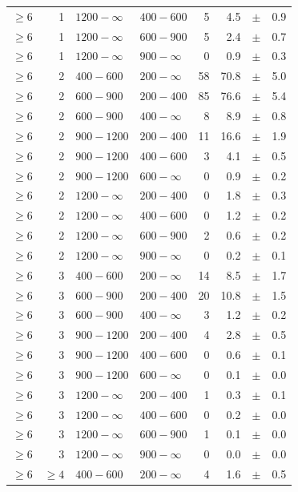 \begin{table}[!h]
\begin{tabular}{rrllrrcl}
$\geq 6$ & 1 & $1200- \infty$ & $400-600$ &      5 &      4.5 &$\pm$&    0.9 \\
$\geq 6$ & 1 & $1200- \infty$ & $600-900$ &      5 &      2.4 &$\pm$&    0.7 \\
$\geq 6$ & 1 & $1200- \infty$ & $900-\infty$ &      0 &      0.9 &$\pm$&    0.3 \\
$\geq 6$\T & 2 & $ 400- 600$ & $200-\infty$ &     58 &     70.8 &$\pm$&    5.0 \\
$\geq 6$\T & 2 & $ 600- 900$ & $200-400$ &     85 &     76.6 &$\pm$&    5.4 \\
$\geq 6$ & 2 & $ 600- 900$ & $400-\infty$ &      8 &      8.9 &$\pm$&    0.8 \\
$\geq 6$\T & 2 & $ 900-1200$ & $200-400$ &     11 &     16.6 &$\pm$&    1.9 \\
$\geq 6$ & 2 & $ 900-1200$ & $400-600$ &      3 &      4.1 &$\pm$&    0.5 \\
$\geq 6$ & 2 & $ 900-1200$ & $600-\infty$ &      0 &      0.9 &$\pm$&    0.2 \\
$\geq 6$\T & 2 & $1200- \infty$ & $200-400$ &      0 &      1.8 &$\pm$&    0.3 \\
$\geq 6$ & 2 & $1200- \infty$ & $400-600$ &      0 &      1.2 &$\pm$&    0.2 \\
$\geq 6$ & 2 & $1200- \infty$ & $600-900$ &      2 &      0.6 &$\pm$&    0.2 \\
$\geq 6$ & 2 & $1200- \infty$ & $900-\infty$ &      0 &      0.2 &$\pm$&    0.1 \\
$\geq 6$\T & 3 & $ 400- 600$ & $200-\infty$ &     14 &      8.5 &$\pm$&    1.7 \\
$\geq 6$\T & 3 & $ 600- 900$ & $200-400$ &     20 &     10.8 &$\pm$&    1.5 \\
$\geq 6$ & 3 & $ 600- 900$ & $400-\infty$ &      3 &      1.2 &$\pm$&    0.2 \\
$\geq 6$\T & 3 & $ 900-1200$ & $200-400$ &      4 &      2.8 &$\pm$&    0.5 \\
$\geq 6$ & 3 & $ 900-1200$ & $400-600$ &      0 &      0.6 &$\pm$&    0.1 \\
$\geq 6$ & 3 & $ 900-1200$ & $600-\infty$ &      0 &      0.1 &$\pm$&    0.0 \\
$\geq 6$\T & 3 & $1200- \infty$ & $200-400$ &      1 &      0.3 &$\pm$&    0.1 \\
$\geq 6$ & 3 & $1200- \infty$ & $400-600$ &      0 &      0.2 &$\pm$&    0.0 \\
$\geq 6$ & 3 & $1200- \infty$ & $600-900$ &      1 &      0.1 &$\pm$&    0.0 \\
$\geq 6$ & 3 & $1200- \infty$ & $900-\infty$ &      0 &      0.0 &$\pm$&    0.0 \\
$\geq 6$\T & $\geq 4$ & $ 400- 600$ & $200-\infty$ &      4 &      1.6 &$\pm$&    0.5 \\
    \hline
  \end{tabular}
\end{table}

